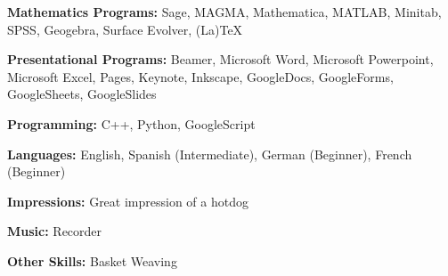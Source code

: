 \documentclass[11pt,letterpaper]{article}
\begin{document}

\begin{enumDiamond}[itemsep=0.1cm]
\item {} 
\end{enumDiamond} \twomedskip




\begin{enumDiamond}[itemsep=0.1cm]
\item {} 
\end{enumDiamond} \twomedskip






\begin{enumSDot}[itemsep= 0cm] %
\item {}
\end{enumSDot} \twomedskip



\begin{enumSDot}[itemsep=0.1cm]
\item {}
\end{enumSDot} \twomedskip





\begin{enumTriangle}
\item {\bfseries Mathematics Programs:} Sage, MAGMA, Mathematica, MATLAB, Minitab, SPSS, Geogebra, Surface Evolver, (La)TeX

\item {\bfseries Presentational Programs:} Beamer, Microsoft Word, Microsoft Powerpoint, Microsoft Excel, Pages, Keynote, Inkscape, GoogleDocs, GoogleForms, GoogleSheets, GoogleSlides

\item {\bfseries Programming:} C++, Python, GoogleScript

\item {\bfseries Languages:} English, Spanish (Intermediate), German (Beginner), French (Beginner)

\item {\bfseries Impressions:} Great impression of a hotdog

\item {\bfseries Music:} Recorder

\item {\bfseries Other Skills:} Basket Weaving
\end{enumTriangle}
\end{document}
